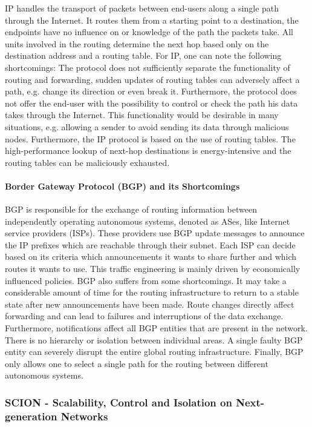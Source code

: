 IP handles the transport of packets between end-users along a single path through the Internet. It routes them from a starting point to a destination, the endpoints have no influence on or knowledge of the path the packets take. All units involved in the routing determine the next hop based only on the destination address and a routing table. For IP, one can note the following shortcomings: The protocol does not sufficiently separate the functionality of routing and forwarding, sudden updates of routing tables can adversely affect a path, e.g. change its direction or even break it. Furthermore, the protocol does not offer the end-user with the possibility to control or check the path his data takes through the Internet. This functionality would be desirable in many situations, e.g. allowing a sender to avoid sending its data through malicious nodes. Furthermore, the IP protocol is based on the use of routing tables. The high-performance lookup of next-hop destinations is energy-intensive and the routing tables can be maliciously exhausted.

\paragraph{Border Gateway Protocol (BGP) and its Shortcomings}

BGP is responsible for the exchange of routing information between independently operating autonomous systems, denoted as ASes, like Internet service providers (ISPs). These providers use BGP update messages to announce the IP prefixes which are reachable through their subnet. Each ISP can decide based on its criteria which announcements it wants to share further and which routes it wants to use. This traffic engineering is mainly driven by economically influenced policies. BGP also suffers from some shortcomings. It may take a considerable amount of time for the routing infrastructure to return to a stable state after new announcements have been made. Route changes directly affect forwarding and can lead to failures and interruptions of the data exchange. Furthermore, notifications affect all BGP entities that are present in the network. There is no hierarchy or isolation between individual areas. A single faulty BGP entity can severely disrupt the entire global routing infrastructure. Finally, BGP only allows one to select a single path for the routing between different autonomous systems. 

\subsubsection{SCION - Scalability, Control and Isolation on Next-generation Networks}

